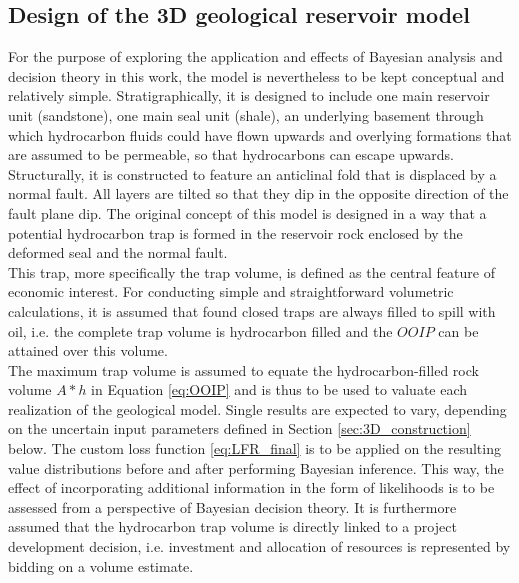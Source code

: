 		\subsection{Design of the 3D geological reservoir model}\label{sec:3D_design}
		For the purpose of exploring the application and effects of Bayesian analysis and decision theory in this work, the model is nevertheless to be kept conceptual and relatively simple. Stratigraphically, it is designed to include one main reservoir unit (sandstone), one main seal unit (shale), an underlying basement through which hydrocarbon fluids could have flown upwards and overlying formations that are assumed to be permeable, so that hydrocarbons can escape upwards. Structurally, it is constructed to feature an anticlinal fold that is displaced by a normal fault. All layers are tilted so that they dip in the opposite direction of the fault plane dip. The original concept of this model is designed in a way that a potential hydrocarbon trap is formed in the reservoir rock enclosed by the deformed seal and the normal fault.\\
		This trap, more specifically the trap volume, is defined as the central feature of economic interest. For conducting simple and straightforward volumetric calculations, it is assumed that found closed traps are always filled to spill with oil, i.e. the complete trap volume is hydrocarbon filled and the $OOIP$ can be attained over this volume.\\
		The maximum trap volume is assumed to equate the hydrocarbon-filled rock volume $A * h$ in Equation \ref{eq:OOIP} and is thus to be used to valuate each realization of the geological model. Single results are expected to vary, depending on the uncertain input parameters defined in Section \ref{sec:3D_construction} below. The custom loss function \ref{eq:LFR_final} is to be applied on the resulting value distributions before and after performing Bayesian inference. This way, the effect of incorporating additional information in the form of likelihoods is to be assessed from a perspective of Bayesian decision theory. It is furthermore assumed that the hydrocarbon trap volume is directly linked to a project development decision, i.e. investment and allocation of resources is represented by bidding on a volume estimate.
		
